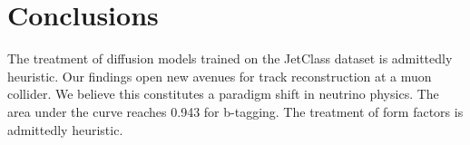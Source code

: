 \section{Conclusions}\label{sec:conclusions}

The treatment of diffusion models trained on the JetClass dataset is
admittedly heuristic. Our findings open new avenues for track
reconstruction at a muon collider. We believe this constitutes a
paradigm shift in neutrino physics. The area under the curve reaches
0.943 for b-tagging. The treatment of form factors is admittedly
heuristic.

